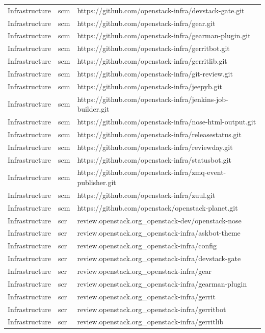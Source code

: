 \documentclass[a4wide,11pt]{report}
\begin{document}
\begin{center}
\begin{longtable}{|p{4cm}|p{1cm}|p{10cm}|}
Infrastructure&scm&https://github.com/openstack-infra/devstack-gate.git\\ 
Infrastructure&scm&https://github.com/openstack-infra/gear.git\\ 
Infrastructure&scm&https://github.com/openstack-infra/gearman-plugin.git\\ 
Infrastructure&scm&https://github.com/openstack-infra/gerritbot.git\\ 
Infrastructure&scm&https://github.com/openstack-infra/gerritlib.git\\ 
Infrastructure&scm&https://github.com/openstack-infra/git-review.git\\ 
Infrastructure&scm&https://github.com/openstack-infra/jeepyb.git\\ 
Infrastructure&scm&https://github.com/openstack-infra/jenkins-job-builder.git\\ 
Infrastructure&scm&https://github.com/openstack-infra/nose-html-output.git\\ 
Infrastructure&scm&https://github.com/openstack-infra/releasestatus.git\\ 
Infrastructure&scm&https://github.com/openstack-infra/reviewday.git\\ 
Infrastructure&scm&https://github.com/openstack-infra/statusbot.git\\ 
Infrastructure&scm&https://github.com/openstack-infra/zmq-event-publisher.git\\ 
Infrastructure&scm&https://github.com/openstack-infra/zuul.git\\ 
Infrastructure&scm&https://github.com/openstack/openstack-planet.git\\ 
Infrastructure&scr&review.openstack.org\_openstack-dev/openstack-nose\\ 
Infrastructure&scr&review.openstack.org\_openstack-infra/askbot-theme\\ 
Infrastructure&scr&review.openstack.org\_openstack-infra/config\\ 
Infrastructure&scr&review.openstack.org\_openstack-infra/devstack-gate\\ 
Infrastructure&scr&review.openstack.org\_openstack-infra/gear\\ 
Infrastructure&scr&review.openstack.org\_openstack-infra/gearman-plugin\\ 
Infrastructure&scr&review.openstack.org\_openstack-infra/gerrit\\ 
Infrastructure&scr&review.openstack.org\_openstack-infra/gerritbot\\ 
Infrastructure&scr&review.openstack.org\_openstack-infra/gerritlib\\ 

\end{longtable}
\end{center}
\end{document}
